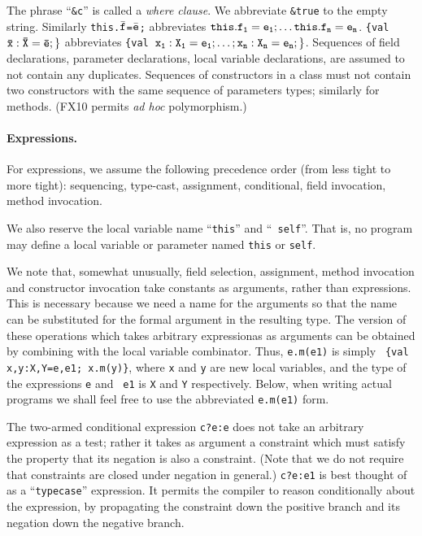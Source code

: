 \documentclass{article}
\def\FXten{{\sf FX10}}
\begin{document}
The phrase ``{\tt \&c}'' is called a {\em where clause}. We abbreviate
{\tt \&true} to the empty string. Similarly {\tt this.$\bar{\tt
f}$=$\bar{\tt e}$;} abbreviates {$\tt this.f_1=e_1;\ldots
this.f_n=e_n$}.  {\tt \{val $\tt\bar{\tt x}:\bar{\tt X}=\bar{\tt e};\}$}
abbreviates {\tt \{val $\tt x_1: X_1= e_1;\ldots; x_n:X_n=e_n;\}$}.
Sequences of field declarations, parameter declarations, local
variable declarations, are assumed to not contain any duplicates.
Sequences of constructors in a class must not contain two constructors
with the same sequence of parameters types; similarly for
methods. (\FXten{} permits {\em ad hoc} polymorphism.)

\paragraph{Expressions.}
For expressions, we assume the following precedence order (from less
tight to more tight): sequencing, type-cast, assignment, conditional,
field invocation, method invocation.

We also reserve the local variable name ``{\tt this}'' and ``{\tt
self}''. That is, no program may define a local variable or parameter
named {\tt this} or {\tt self}. 

We note that, somewhat unusually, field selection, assignment, method
invocation and constructor invocation take constants as arguments,
rather than expressions. This is necessary because we need a name for
the arguments so that the name can be substituted for the formal
argument in the resulting type. The version of these operations which
takes arbitrary expressionas as arguments can be obtained by combining
with the local variable combinator. Thus, {\tt e.m(e1)} is simply {\tt
\{val x,y:X,Y=e,e1; x.m(y)\}}, where {\tt x} and {\tt y} are
new local variables, and the type of the expressions {\tt e} and {\tt
e1} is {\tt X} and {\tt Y} respectively. Below, when writing actual
programs we shall feel free to use the abbreviated {\tt e.m(e1)} form.

The two-armed conditional expression {\tt c?e:e} does not take an
arbitrary expression as a test; rather it takes as argument a
constraint which must satisfy the property that its negation is also a
constraint. (Note that we do not require that constraints are closed
under negation in general.) {\tt c?e:e1} is best thought of as a
``{\tt typecase}'' expression. It permits the compiler to reason
conditionally about the expression, by propagating the
constraint down the positive branch and its negation down the negative
branch.
\end{document}
